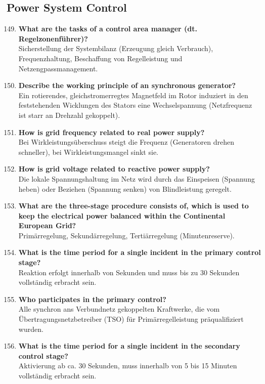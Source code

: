 \documentclass{article}
\begin{document}
\subsection*{Power System Control}
\begin{enumerate}
    \setcounter{enumi}{148}
    \item \textbf{What are the tasks of a control area manager (dt. Regelzonenführer)?} \\
    Sicherstellung der Systembilanz (Erzeugung gleich Verbrauch), Frequenzhaltung, Beschaffung von Regelleistung und Netzengpassmanagement.
    \item \textbf{Describe the working principle of an synchronous generator?} \\
    Ein rotierendes, gleichstromerregtes Magnetfeld im Rotor induziert in den feststehenden Wicklungen des Stators eine Wechselspannung (Netzfrequenz ist starr an Drehzahl gekoppelt).
    \item \textbf{How is grid frequency related to real power supply?} \\
    Bei Wirkleistungsüberschuss steigt die Frequenz (Generatoren drehen schneller), bei Wirkleistungsmangel sinkt sie.
    \item \textbf{How is grid voltage related to reactive power supply?} \\
    Die lokale Spannungshaltung im Netz wird durch das Einspeisen (Spannung heben) oder Beziehen (Spannung senken) von Blindleistung geregelt.
    \item \textbf{What are the three-stage procedure consists of, which is used to keep the electrical power balanced within the Continental European Grid?} \\
    Primärregelung, Sekundärregelung, Tertiärregelung (Minutenreserve).
    \item \textbf{What is the time period for a single incident in the primary control stage?} \\
    Reaktion erfolgt innerhalb von Sekunden und muss bis zu 30 Sekunden vollständig erbracht sein.
    \item \textbf{Who participates in the primary control?} \\
    Alle synchron ans Verbundnetz gekoppelten Kraftwerke, die vom Übertragungsnetzbetreiber (TSO) für Primärregelleistung präqualifiziert wurden.
    \item \textbf{What is the time period for a single incident in the secondary control stage?} \\
    Aktivierung ab ca. 30 Sekunden, muss innerhalb von 5 bis 15 Minuten vollständig erbracht sein.

\end{enumerate}
\end{document}
